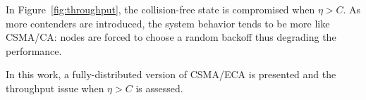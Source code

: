

In Figure~\ref{fig:throughput}, the collision-free state is compromised when $\eta>C$. As more contenders are introduced, the system behavior tends to be more like CSMA/CA: nodes are forced to choose a random backoff thus degrading the performance.

In this work, a fully-distributed version of CSMA/ECA is presented and the throughput issue when $\eta > C$ is assessed.